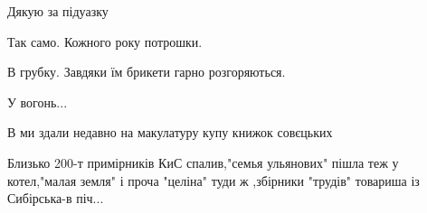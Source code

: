 \begin{itemize}
 
Дякую за підуазку

 
Так само. Кожного року потрошки.

 
В грубку. Завдяки їм брикети гарно розгоряються.

 
У вогонь...

 
В ми здали недавно на макулатуру купу книжок совєцьких

 

Близько 200-т примірників КиС спалив,"семья ульянових" пішла теж у котел,"малая
земля" і проча "целіна" туди ж ,збірники "трудів" товариша із Сибірська-в
піч...


 

\end{itemize}
